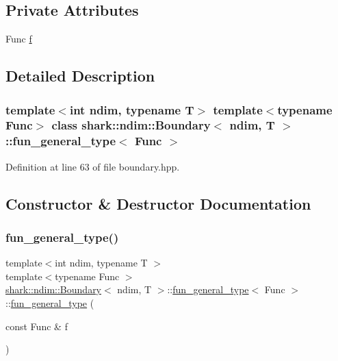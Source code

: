 \subsection*{Private Attributes}
\begin{DoxyCompactItemize}
\item 
Func \hyperlink{classshark_1_1ndim_1_1_boundary_1_1fun__general__type_a7a2449e92b694dd4d966e17c4d999a91}{f}
\end{DoxyCompactItemize}


\subsection{Detailed Description}
\subsubsection*{template$<$int ndim, typename T$>$\newline
template$<$typename Func$>$\newline
class shark\+::ndim\+::\+Boundary$<$ ndim, T $>$\+::fun\+\_\+general\+\_\+type$<$ Func $>$}



Definition at line 63 of file boundary.\+hpp.



\subsection{Constructor \& Destructor Documentation}
\hypertarget{classshark_1_1ndim_1_1_boundary_1_1fun__general__type_af5d09f114b529e82be303a9b9896a84b}{}\label{classshark_1_1ndim_1_1_boundary_1_1fun__general__type_af5d09f114b529e82be303a9b9896a84b} 
\subsubsection{\texorpdfstring{fun\+\_\+general\+\_\+type()}{fun\_general\_type()}}
{\footnotesize\ttfamily template$<$int ndim, typename T $>$ \\
template$<$typename Func $>$ \\
\hyperlink{classshark_1_1ndim_1_1_boundary}{shark\+::ndim\+::\+Boundary}$<$ ndim, T $>$\+::\hyperlink{classshark_1_1ndim_1_1_boundary_1_1fun__general__type}{fun\+\_\+general\+\_\+type}$<$ Func $>$\+::\hyperlink{classshark_1_1ndim_1_1_boundary_1_1fun__general__type}{fun\+\_\+general\+\_\+type} (\begin{DoxyParamCaption}\item[{const Func \&}]{f }\end{DoxyParamCaption})}



